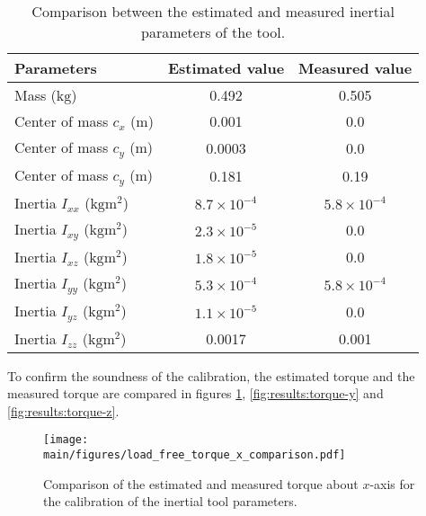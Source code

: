 \documentclass[/home/francois/latex/report/main.tex]{subfiles}
\begin{document}
\begin{table}[h]
  \begin{center}
    \renewcommand{\arraystretch}{1.2} %
    \begin{tabular}{l|c|c} %
      \textbf{Parameters} & \textbf{Estimated value} & \textbf{Measured value}\\
      \hline
      Mass ($\si{\kilogram}$)  & 0.492 & 0.505 \\
      \hline
      Center of mass $c_x$ ($\si{\meter}$)  & 0.001 & 0.0 \\
      \hline
      Center of mass $c_y$ ($\si{\meter}$)  & 0.0003 & 0.0 \\
      \hline
      Center of mass $c_y$ ($\si{\meter}$)  & 0.181 & 0.19 \\
      \hline
      Inertia $I_{xx}$ ($\si{\kilogram\meter\squared}$)  & $8.7 \times 10^{-4}$ & $5.8 \times 10^{-4}$ \\
      \hline
      Inertia $I_{xy}$ ($\si{\kilogram\meter\squared}$)  & $2.3 \times 10^{-5}$ & 0.0 \\
      \hline
      Inertia $I_{xz}$ ($\si{\kilogram\meter\squared}$)  & $1.8 \times 10^{-5}$ & 0.0 \\
      \hline
      Inertia $I_{yy}$ ($\si{\kilogram\meter\squared}$)  & $5.3 \times 10^{-4}$ & $5.8 \times 10^{-4}$ \\
      \hline
      Inertia $I_{yz}$ ($\si{\kilogram\meter\squared}$)  & $1.1 \times 10^{-5}$ & 0.0 \\
      \hline
      Inertia $I_{zz}$ ($\si{\kilogram\meter\squared}$)  & 0.0017 & 0.001 \\
      \hline
    \end{tabular}
  \end{center}
  \caption{Comparison between the estimated and measured inertial parameters of the tool.\label{tab:results:calibration-tool}}
\end{table}

To confirm the soundness of the calibration, the estimated torque and the measured torque are compared in figures \ref{fig:results:torque-x}, \ref{fig:results:torque-y} and \ref{fig:results:torque-z}.

\begin{figure}[H]
  \centering
  \texttt{[image: \\main/figures/load\_free\_torque\_x\_comparison.pdf]}
  \caption{Comparison of the estimated and measured torque about $x$-axis for the calibration of the inertial tool parameters.}
  \label{fig:results:torque-x}
\end{figure}
\end{document}
